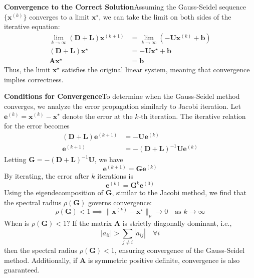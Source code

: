 \textbf{Convergence to the Correct Solution}\quad Assuming the Gauss-Seidel sequence $\{\mathbf{x}^{(k)}\}$ converges to a limit $\mathbf{x}^\star$, we can take the limit on both sides of the iterative equation:
\begin{align*}
    \lim_{k \to \infty} (\mathbf{D} + \mathbf{L})\mathbf{x}^{(k+1)} &= \lim_{k \to \infty} \left( -\mathbf{U}\mathbf{x}^{(k)} + \mathbf{b} \right) \\
    (\mathbf{D} + \mathbf{L})\mathbf{x}^\star &= -\mathbf{U}\mathbf{x}^\star + \mathbf{b} \\
    \mathbf{A}\mathbf{x}^\star &= \mathbf{b}
\end{align*}
Thus, the limit $\mathbf{x}^\star$ satisfies the original linear system, meaning that convergence implies correctness.

\textbf{Conditions for Convergence}\quad To determine when the Gauss-Seidel method converges, we analyze the error propagation similarly to Jacobi iteration. Let $\mathbf{e}^{(k)} = \mathbf{x}^{(k)} - \mathbf{x}^\star$ denote the error at the $k$-th iteration. The iterative relation for the error becomes
\begin{align*}
    (\mathbf{D} + \mathbf{L})\mathbf{e}^{(k+1)} &= -\mathbf{U}\mathbf{e}^{(k)} \\
    \mathbf{e}^{(k+1)} &= -(\mathbf{D} + \mathbf{L})^{-1}\mathbf{U}\mathbf{e}^{(k)}
\end{align*}
Letting $\mathbf{G} = -(\mathbf{D} + \mathbf{L})^{-1}\mathbf{U}$, we have
\begin{equation*}
    \mathbf{e}^{(k+1)} = \mathbf{G}\mathbf{e}^{(k)}
\end{equation*}
By iterating, the error after $k$ iterations is
\begin{equation*}
    \mathbf{e}^{(k)} = \mathbf{G}^k \mathbf{e}^{(0)}
\end{equation*}
Using the eigendecomposition of $\mathbf{G}$, similar to the Jacobi method, we find that the spectral radius $\rho(\mathbf{G})$ governs convergence:
\begin{equation*}
    \rho(\mathbf{G}) < 1 \implies \|\mathbf{x}^{(k)} - \mathbf{x}^\star\|_p \to 0 \quad \text{as } k \to \infty
\end{equation*}
When is $\rho(\mathbf{G}) < 1$? If the matrix $\mathbf{A}$ is strictly diagonally dominant, i.e.,
\begin{equation*}
    |a_{ii}| > \sum_{j \neq i} |a_{ij}| \quad \forall i
\end{equation*}
then the spectral radius $\rho(\mathbf{G}) < 1$, ensuring convergence of the Gauss-Seidel method. Additionally, if $\mathbf{A}$ is symmetric positive definite, convergence is also guaranteed.

